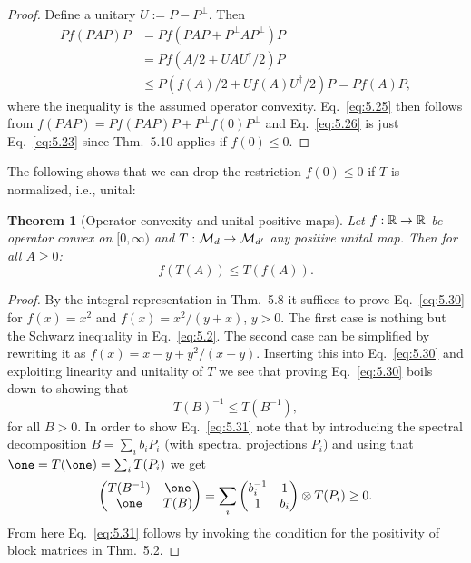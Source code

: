 \documentclass[11pt,a4paper]{article}
\theoremstyle{plain}
\newtheorem{theorem}{Theorem}[section]
\theoremstyle{definition}
\theoremstyle{remark}
\numberwithin{equation}{section}
\begin{document}
\begin{proof}
    Define a unitary $U:=P-P^\perp$. Then
    \begin{align}
        P f(PAP)P
         &= P f(PAP + P^\perp A P^\perp)P \label{eq:5.27}\\
         &= P f(A/2 + UAU^\dagger/2)P \label{eq:5.28}\\
         &\le P\left(f(A)/2 + U f(A)U^\dagger/2\right)P = P f(A)P,
        \label{eq:5.29}
    \end{align}
    where the inequality is the assumed operator convexity. Eq.~\eqref{eq:5.25} then
    follows from $f(PAP)=Pf(PAP)P + P^\perp f(0)P^\perp$ and Eq.~\eqref{eq:5.26} is just
    Eq.~\eqref{eq:5.23} since Thm.~5.10 applies if $f(0)\le 0$.
\end{proof}

The following shows that we can drop the restriction $f(0)\le 0$ if $T$ is normalized,
i.e., unital:

\begin{theorem}[Operator convexity and unital positive maps]
    Let $f:\mathbb{R}\to \mathbb{R}$ be operator convex on $[0,\infty)$ and $T:\mathcal{M}_d\to \mathcal{M}_{d'}$ any
    positive unital map. Then for all $A\ge 0$:
    \begin{equation}\label{eq:5.30}
        f(T(A)) \le T(f(A)).
    \end{equation}
\end{theorem}

\begin{proof}
    By the integral representation in Thm.~5.8 it suffices to prove Eq.~\eqref{eq:5.30}
    for $f(x)=x^2$ and $f(x)=x^2/(y+x)$, $y>0$. The first case is nothing but the Schwarz
    inequality in Eq.~\eqref{eq:5.2}. The second case can be simplified by rewriting it
    as $f(x)=x-y+y^2/(x+y)$. Inserting this into Eq.~\eqref{eq:5.30} and exploiting
    linearity and unitality of $T$ we see that proving Eq.~\eqref{eq:5.30} boils down to
    showing that
    \begin{equation}\label{eq:5.31}
        T(B)^{-1} \le T(B^{-1}),
    \end{equation}
    for all $B>0$. In order to show Eq.~\eqref{eq:5.31} note that by introducing the
    spectral decomposition $B=\sum_i b_i P_i$ (with spectral projections $P_i$) and using
    that $\one=T(\one)=\sum_i T(P_i)$ we get
    \begin{equation}\label{eq:5.32}
        \begin{pmatrix}
            T(B^{-1}) &\one\\
            \one      &T(B)
        \end{pmatrix}
        =
        \sum_i
        \begin{pmatrix}
            b_i^{-1} &1\\
            1        &b_i
        \end{pmatrix}
        \otimes T(P_i)
        \ge 0.
    \end{equation}
    From here Eq.~\eqref{eq:5.31} follows by invoking the condition for the positivity of
    block matrices in Thm.~5.2.
\end{proof}
\end{document}
